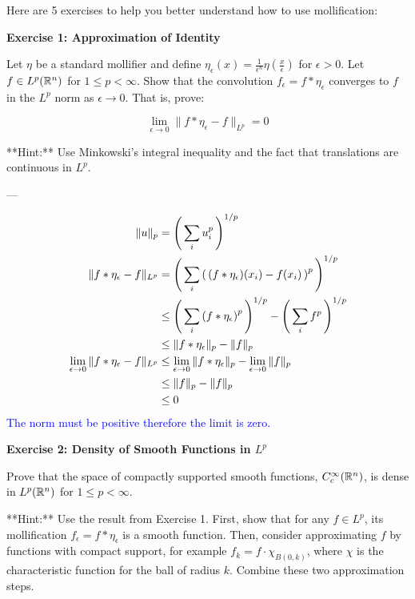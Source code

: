 \documentclass[12pt,a4paper]{report}
\newcommand{\BLUE}[1]{\textcolor{blue}{#1}}
\begin{document}
\begin{description}
Here are 5 exercises to help you better understand how to use mollification:

\begin{description}

\item \textbf{Exercise 1: Approximation of Identity}

Let \( \eta \) be a standard mollifier and define \( \eta_\epsilon(x) = \frac{1}{\epsilon^n} \eta(\frac{x}{\epsilon}) \) for \( \epsilon > 0 \). Let \( f \in L^p(\mathbb{R}^n) \) for \( 1 \leq p < \infty \). Show that the convolution \( f_\epsilon = f * \eta_\epsilon \) converges to \( f \) in the \( L^p \) norm as \( \epsilon \to 0 \). That is, prove:

\[ \lim_{\epsilon \to 0} \|f * \eta_\epsilon - f\|_{L^p} = 0 \]

**Hint:** Use Minkowski's integral inequality and the fact that translations are continuous in \( L^p \).

---

\BLUE{\begin{align*}
	\|u\|_p &= \left (\, \sum_i u_i^p \,\right )^{1/p} \\
	\|f * \eta_\epsilon - f\|_{L^p} &= \left (\, \sum_i \left (\,  (f * \eta_\epsilon) (x_i) - f(x_i) \,\right )^p \,\right )^{1/p} \\
	&\le \left (\, \sum_i {(f * \eta_\epsilon)}^p \,\right )^{1/p}-\left (\, \sum_i {f}^p \,\right )^{1/p} \\
	&\le \|f * \eta_\epsilon\|_p - \|f\|_p \\
	\lim_{\epsilon\to 0} \|f * \eta_\epsilon - f\|_{L^p} &\le \lim_{\epsilon\to 0} \|f * \eta_\epsilon\|_p - \lim_{\epsilon\to 0} \|f\|_p \\
	&\le \|f\|_p - \|f\|_p \\
	&\le 0
\end{align*}The norm must be positive therefore the limit is zero.
}

\item  \textbf{Exercise 2: Density of Smooth Functions in \( L^p \)}

Prove that the space of compactly supported smooth functions, \( C_c^\infty(\mathbb{R}^n) \), is dense in \( L^p(\mathbb{R}^n) \) for \( 1 \leq p < \infty \).

**Hint:** Use the result from Exercise 1. First, show that for any \( f \in L^p \), its mollification \( f_\epsilon = f * \eta_\epsilon \) is a smooth function. Then, consider approximating \( f \) by functions with compact support, for example \( f_k = f \cdot \chi_{B(0,k)} \), where \( \chi \) is the characteristic function for the ball of radius \( k \). Combine these two approximation steps.


\end{description}
\end{description}
\end{document}

